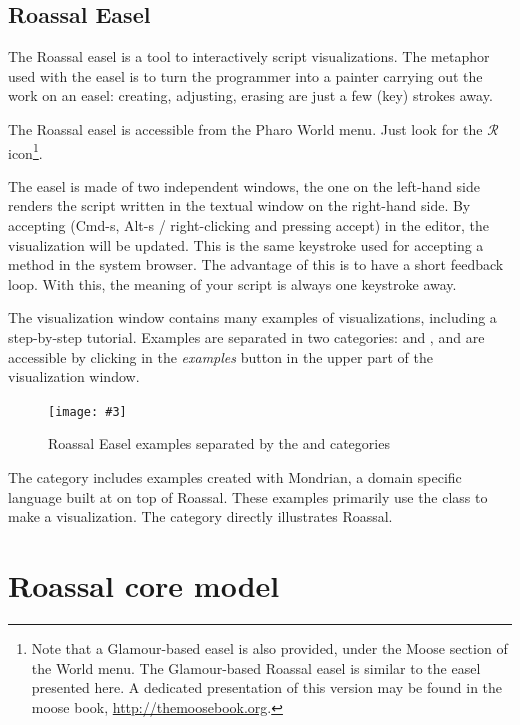 \documentclass[a4paper,10pt,twoside]{book}
\newcommand{\fig}[4]{
		\begin{figure}[#1]
			\centering
			\texttt{[image: \#3]}
			\caption{\label{fig:#3}#4}
		\end{figure}}
\begin{document}
\subsection{Roassal Easel}

The Roassal easel is a tool to interactively script visualizations. The metaphor used with the easel is to turn the programmer into a painter carrying out the work on an easel: creating, adjusting, erasing are just a few (key) strokes away.

The Roassal easel is accessible from the Pharo World menu. Just look for the {\color{red} $\mathcal{R}$} icon\footnote{Note that a Glamour-based easel is also provided, under the Moose section of the World menu. The Glamour-based Roassal easel is similar to the easel presented here. A dedicated presentation of this version may be found in the moose book, \url{http://themoosebook.org}.}.

The easel is made of two independent windows, the one on the left-hand side renders the script written in the textual window on the right-hand side. By accepting (Cmd-s, Alt-s / right-clicking and pressing accept) in the editor, the visualization will be updated. This is the same keystroke used for accepting a method in the system browser. The advantage of this is to have a short feedback loop. With this, the meaning of your script is always one keystroke away.

The visualization window contains many examples of visualizations, including a step-by-step tutorial. Examples are separated in two categories:  and , and are accessible by clicking in the \textit{examples} button in the upper part of the visualization window.

\fig{H}{0.8}{ROEasel}{Roassal Easel examples separated by the \ct{ROMondrianViewBuilder} and \ct{ROExample} categories}


The  category includes examples created with Mondrian, a domain specific language built at on top of Roassal. These examples primarily use the  class to make a visualization. The   category directly illustrates Roassal.


\section{Roassal core model}
\end{document}
